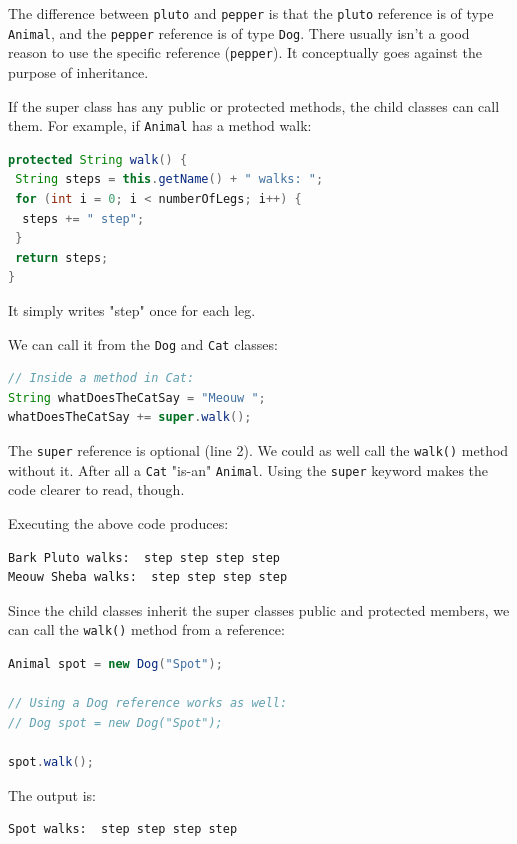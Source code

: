 The difference between \texttt{pluto} and \texttt{pepper} is that the \texttt{pluto} reference is of type \texttt{Animal}, and the \texttt{pepper} reference is of type \texttt{Dog}. There usually isn't a good reason to use the specific reference (\texttt{pepper}). It conceptually goes against the purpose of inheritance.

If the super class has any public or protected methods, the child classes can call them. For example, if \texttt{Animal} has a method walk:
\begin{lstlisting}[language=Java]
protected String walk() {
 String steps = this.getName() + " walks: ";
 for (int i = 0; i < numberOfLegs; i++) {
  steps += " step";
 }
 return steps;
}
\end{lstlisting}

It simply writes "step" once for each leg.

We can call it from the \texttt{Dog} and \texttt{Cat} classes:

\begin{lstlisting}[language=Java]
// Inside a method in Cat:
String whatDoesTheCatSay = "Meouw ";
whatDoesTheCatSay += super.walk();
\end{lstlisting}

The \texttt{super} reference is optional (line 2). We could as well call the \texttt{walk()} method without it. After all a \texttt{Cat} "is-an" \texttt{Animal}. Using the \texttt{super} keyword makes the code clearer to read, though.

Executing the above code produces:
\begin{lstlisting}
Bark Pluto walks:  step step step step
Meouw Sheba walks:  step step step step
\end{lstlisting}


Since the child classes inherit the super classes public and protected members, we can call the \texttt{walk()} method from a reference:

\begin{lstlisting}[language=Java]
Animal spot = new Dog("Spot");

// Using a Dog reference works as well:
// Dog spot = new Dog("Spot"); 

spot.walk();
\end{lstlisting}

The output is:

\begin{lstlisting}
Spot walks:  step step step step
\end{lstlisting}

